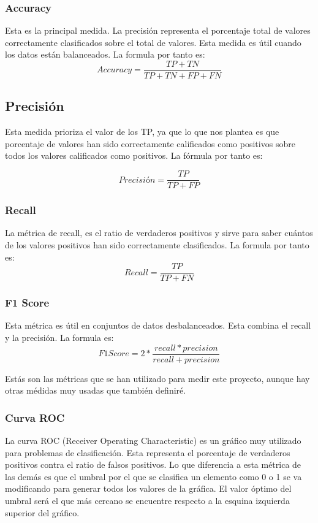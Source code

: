 \subsubsection{Accuracy}
Esta es la principal medida. La precisión representa el porcentaje total de valores correctamente clasificados sobre el total de valores. Esta medida es útil cuando los datos están balanceados. La formula por tanto es:
\begin{equation}
	Accuracy=\frac{TP+TN}{TP+TN+FP+FN}
\end{equation}
 
\subsection{Precisión}
Esta medida prioriza el valor de los TP, ya que lo que nos plantea es que porcentaje de valores han sido correctamente calificados como positivos sobre todos los valores calificados como positivos. La fórmula por tanto es:

\begin{equation}
	Precisión=\frac{TP}{TP+FP}
\end{equation}

\subsubsection{Recall}
La métrica de recall, es el ratio de verdaderos positivos y sirve para saber cuántos de los valores positivos han sido correctamente clasificados. La formula por tanto es:
\begin{equation}
	Recall=\frac{TP}{TP+FN}
\end{equation}

\subsubsection{F1 Score}
Esta métrica es útil en conjuntos de datos desbalanceados. Esta combina el recall y la precisión. La formula es:
\begin{equation}
	F1 Score=2*\frac{recall*precision}{recall+precision}
\end{equation}

Estás son las métricas que se han utilizado para medir este proyecto, aunque hay otras médidas muy usadas que también definiré.

\subsubsection{Curva ROC}
La curva ROC (Receiver Operating Characteristic) es un gráfico muy utilizado para problemas de clasificación. Esta representa el porcentaje de verdaderos positivos contra el ratio de falsos positivos. Lo que diferencia a esta métrica de las demás es que el umbral por el que se clasifica un elemento como 0 o 1 se va modificando para generar todos los valores de la gráfica. El valor óptimo del umbral será el que más cercano se encuentre respecto a la esquina izquierda superior del gráfico.

